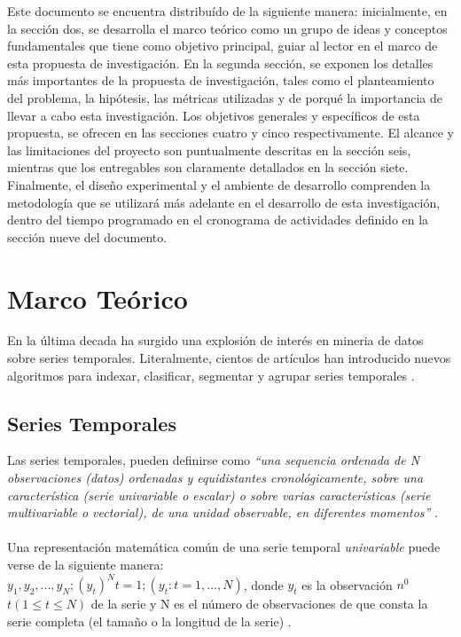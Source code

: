 Este documento se encuentra distribu\'ido de la siguiente manera: inicialmente, en la secci\'on dos, se desarrolla el marco te\'orico como un grupo de ideas y conceptos fundamentales que tiene como objetivo principal, guiar al lector en el marco de esta propuesta de investigaci\'on. En la segunda secci\'on, se exponen los detalles m\'as importantes de la propuesta de investigaci\'on, tales como el planteamiento del problema, la hip\'otesis, las m\'etricas utilizadas y de porqu\'e la importancia de llevar a cabo esta investigaci\'on. Los objetivos generales y espec\'ificos de esta propuesta, se ofrecen en las secciones cuatro y cinco respectivamente. El alcance y las limitaciones del proyecto son puntualmente descritas en la secci\'on seis, mientras que los entregables son claramente detallados en la secci\'on siete. Finalmente, el dise\~no experimental y el ambiente de desarrollo comprenden la metodolog\'ia que se utilizar\'a m\'as adelante en el desarrollo de esta investigaci\'on, dentro del tiempo programado en el cronograma de actividades definido en la secci\'on nueve del documento.
\section{\textbf{Marco Te\'orico}}
En la \'ultima decada ha surgido una explosi\'on de inter\'es en mineria de datos sobre series temporales. Literalmente, cientos de art\'iculos han introducido nuevos algoritmos para indexar, clasificar, segmentar y agrupar series temporales \cite{sigmod}. 
\subsection{Series Temporales}
Las series temporales, pueden definirse como \textit{\enquote{una sequencia ordenada de N observaciones (datos) ordenadas y equidistantes cronol\'ogicamente, sobre una caracter\'istica (serie univariable o escalar) o sobre varias caracter\'isticas (serie multivariable o vectorial), de una unidad observable, en diferentes momentos}} \cite{tak-chung}.\\\\
Una representaci\'on matem\'atica com\'un de una serie temporal \textit{univariable} puede verse de la siguiente manera:\\
$y_1, y_2,...,y_N;(y_t)^N t=1;(y_t:t=1,...,N)$, donde $y_t$ es la observaci\'on $n^0$ $t(1 \leq t \leq N)$ de la serie y N es el n\'umero de observaciones de que consta la serie completa (el tama\~no o la longitud de la serie) \cite{concepts}.
